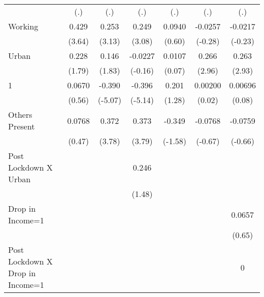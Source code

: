 \begin{table*}[htbp]
\begin{tabular}{l*{6}{c}}
                    &         (.)         &         (.)         &         (.)         &         (.)         &         (.)         &         (.)         \\
[1em]
Working             &       0.429\sym{***}&       0.253\sym{**} &       0.249\sym{**} &      0.0940         &     -0.0257         &     -0.0217         \\
                    &      (3.64)         &      (3.13)         &      (3.08)         &      (0.60)         &     (-0.28)         &     (-0.23)         \\
[1em]
Urban               &       0.228         &       0.146         &     -0.0227         &      0.0107         &       0.266\sym{**} &       0.263\sym{**} \\
                    &      (1.79)         &      (1.83)         &     (-0.16)         &      (0.07)         &      (2.96)         &      (2.93)         \\
[1em]
1                   &      0.0670         &      -0.390\sym{***}&      -0.396\sym{***}&       0.201         &     0.00200         &     0.00696         \\
                    &      (0.56)         &     (-5.07)         &     (-5.14)         &      (1.28)         &      (0.02)         &      (0.08)         \\
[1em]
Others Present      &      0.0768         &       0.372\sym{***}&       0.373\sym{***}&      -0.349         &     -0.0768         &     -0.0759         \\
                    &      (0.47)         &      (3.78)         &      (3.79)         &     (-1.58)         &     (-0.67)         &     (-0.66)         \\
[1em]
Post Lockdown X Urban&                     &                     &       0.246         &                     &                     &                     \\
                    &                     &                     &      (1.48)         &                     &                     &                     \\
[1em]
Drop in Income=1    &                     &                     &                     &                     &                     &      0.0657         \\
                    &                     &                     &                     &                     &                     &      (0.65)         \\
[1em]
Post Lockdown X Drop in Income=1&                     &                     &                     &                     &                     &           0         \\

\end{tabular}
\end{table*}
